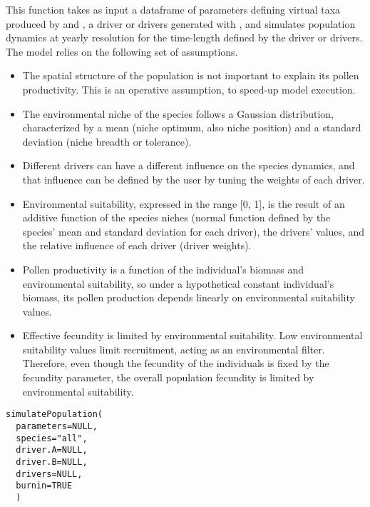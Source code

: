 \documentclass[letterpaper]{book}
\begin{document}
\begin{Description}\relax
This function takes as input a dataframe of parameters defining virtual taxa produced by  and , a driver or drivers generated with , and simulates population dynamics at yearly resolution for the time-length defined by the driver or drivers. The model relies on the following set of assumptions.

\begin{itemize}

\item  The spatial structure of the population is not important to explain its pollen productivity. This is an operative assumption, to speed-up model execution.
\item  The environmental niche of the species follows a Gaussian distribution, characterized by a mean (niche optimum, also niche position) and a standard deviation (niche breadth or tolerance).
\item  Different drivers can have a different influence on the species dynamics, and that influence can be defined by the user by tuning the weights of each driver.
\item  Environmental suitability, expressed in the range [0, 1], is the result of an additive function of the species niches (normal function defined by the species' mean and standard deviation for each driver), the drivers' values, and the relative influence of each driver (driver weights).
\item  Pollen productivity is a function of the individual's biomass and environmental suitability, so under a hypothetical constant individual's biomass, its pollen production depends linearly on environmental suitability values.
\item  Effective fecundity is limited by environmental suitability. Low environmental suitability values limit recruitment, acting as an environmental filter. Therefore, even though the fecundity of the individuals is fixed by the fecundity parameter, the overall population fecundity is limited by environmental suitability.

\end{itemize}

\end{Description}
%
\begin{Usage}
\begin{verbatim}
simulatePopulation(
  parameters=NULL,
  species="all",
  driver.A=NULL,
  driver.B=NULL,
  drivers=NULL,
  burnin=TRUE
  )
\end{verbatim}
\end{Usage}
\end{document}
